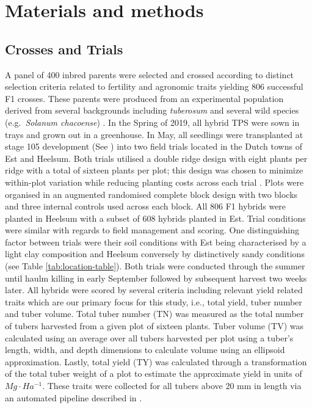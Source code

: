 \section{Materials and methods}
\label{sec:materials:methods}

\subsection{Crosses and Trials}

A panel of 400 inbred parents were selected and crossed according to distinct selection criteria related to fertility and agronomic traits yielding 806 successful F1 crosses. These parents were produced from an experimental population derived from several backgrounds including \emph{tuberosum} and several wild species (e.g.~\emph{Solanum chacoense}) \parencite{Lindhout2018}. In the Spring of 2019, all hybrid TPS were sown in trays and grown out in a greenhouse. In May, all seedlings were transplanted at stage 105 development (See \parencite{Kacheyo2021}) into two field trials located in the Dutch towns of Est and Heelsum. Both trials utilised a double ridge design with eight plants per ridge with a total of sixteen plants per plot; this design was chosen to minimize within-plot variation while reducing planting costs across each trial \parencite{Stockem2021}. Plots were organised in an augmented randomised complete block design with two blocks and three internal controls used across each block. All 806 F1 hybrids were planted in Heelsum with a subset of 608 hybrids planted in Est. Trial conditions were similar with regards to field management and scoring. One distinguishing factor between trials were their soil conditions with Est being characterised by a light clay composition and Heelsum conversely by distinctively sandy conditions (see Table \ref{tab:location-table}). Both trials were conducted through the summer until haulm killing in early September followed by subsequent harvest two weeks later. All hybrids were scored by several criteria including relevant yield related traits which are our primary focus for this study, i.e., total yield, tuber number and tuber volume. Total tuber number (TN) was measured as the total number of tubers harvested from a given plot of sixteen plants. Tuber volume (TV) was calculated using an average over all tubers harvested per plot using a tuber's length, width, and depth dimensions to calculate volume using an ellipsoid approximation. Lastly, total yield (TY) was calculated through a transformation of the total tuber weight of a plot to estimate the approximate yield in units of \(Mg \cdot Ha^{-1}\). These traits were collected for all tubers above 20 mm in length via an automated pipeline described in \parencite{Stockem2020}.


